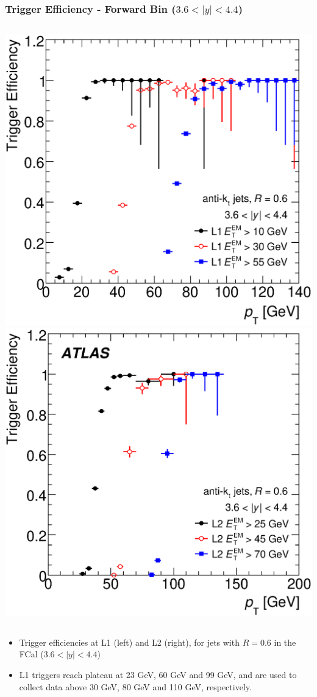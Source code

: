 \documentclass[10pt]{beamer}
\begin{document}
\begin{frame}\frametitle{Trigger Efficiency - Forward Bin ($3.6 < |y|< 4.4$)}
\begin{columns}
\includegraphics[width=0.8\linewidth,angle=0]{L1_triggers_forward_bin_akt6.eps}
\includegraphics[width=0.8\linewidth,angle=0]{L1L2_triggers_forward_binm_akt6.eps}
\end{columns}
\begin{itemize}
\item Trigger efficiencies at L1 (left) and L2 (right), for jets with $R=0.6$ in the FCal ($3.6 < |y| < 4.4$)
\item L1 triggers reach plateau at 23 GeV, 60 GeV and 99 GeV, and are used to collect data above 30 GeV, 80 GeV and 110 GeV, respectively.
\end{itemize}
\end{frame}
\end{document}

